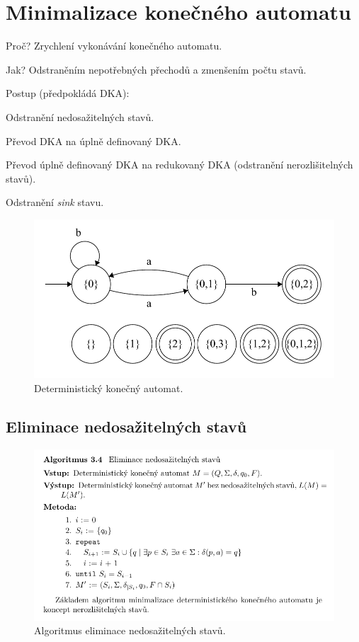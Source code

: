 
\section{Minimalizace konečného automatu}

\begin{compactitem}
    \item Proč? Zrychlení vykonávání konečného automatu.
    \item Jak? Odstraněním nepotřebných přechodů a zmenšením počtu stavů.
    \item Postup (předpokládá DKA): \begin{compactenum}
        \item Odstranění nedosažitelných stavů.
        \item Převod DKA na úplně definovaný DKA.
        \item Převod úplně definovaný DKA na redukovaný DKA (odstranění nerozlišitelných stavů).
        \item Odstranění \textit{sink} stavu.
    \end{compactenum}
\end{compactitem}

\begin{figure}[H]
    \centering
    \includegraphics[width=0.75\linewidth]{dka_uplny.pdf}
    \caption{Deterministický konečný automat.}
\end{figure}

\subsection{Eliminace nedosažitelných stavů}

\begin{figure}[H]
    \centering
    \includegraphics[width=0.9\linewidth]{eliminace_nedosazitelnych_stavu.pdf}
    \caption{Algoritmus eliminace nedosažitelných stavů.}
\end{figure}

